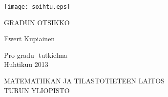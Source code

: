 \documentclass[a4paper,12pt,twoside]{article} %
\begin{document}
\pagestyle{empty}  %

\begin{center}
\texttt{[image: soihtu.eps]} %
\end{center}

\vspace{3.0cm}
\begin{center}\large
GRADUN OTSIKKO
\end{center}

\vspace{0.5cm}
\begin{center}
Ewert Kupiainen
\end{center}

\vspace{0.5cm}
\begin{center}
Pro gradu -tutkielma\\
Huhtikuu 2013
\end{center}

\vspace{5.0cm}
\begin{center}
MATEMATIIKAN JA TILASTOTIETEEN LAITOS\\
TURUN YLIOPISTO\\
\end{center}

\cleardoublepage

\addtolength{\oddsidemargin}{-1.1cm}
\addtolength{\voffset}{-2.3cm}
\end{document}
